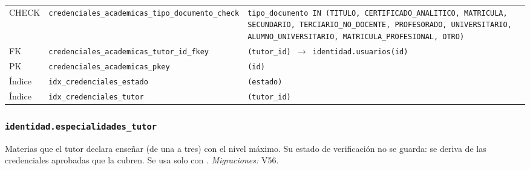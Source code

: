 {\begin{xltabular}{\textwidth}{@{}>{\raggedright\arraybackslash}p{1.7cm} >{\raggedright\arraybackslash}p{4.6cm} L@{}}
    CHECK & \texttt{credenciales\_\allowbreak{}academicas\_\allowbreak{}tipo\_\allowbreak{}documento\_\allowbreak{}check} & \texttt{tipo\_\allowbreak{}documento IN (\allowbreak{}\textquotesingle{}TITULO\textquotesingle{},\allowbreak{} \textquotesingle{}CERTIFICADO\_\allowbreak{}ANALITICO\textquotesingle{},\allowbreak{} \textquotesingle{}MATRICULA\textquotesingle{},\allowbreak{} \textquotesingle{}SECUNDARIO\textquotesingle{},\allowbreak{} \textquotesingle{}TERCIARIO\_\allowbreak{}NO\_\allowbreak{}DOCENTE\textquotesingle{},\allowbreak{} \textquotesingle{}PROFESORADO\textquotesingle{},\allowbreak{} \textquotesingle{}UNIVERSITARIO\textquotesingle{},\allowbreak{} \textquotesingle{}ALUMNO\_\allowbreak{}UNIVERSITARIO\textquotesingle{},\allowbreak{} \textquotesingle{}MATRICULA\_\allowbreak{}PROFESIONAL\textquotesingle{},\allowbreak{} \textquotesingle{}OTRO\textquotesingle{})} \\
    FK & \texttt{credenciales\_\allowbreak{}academicas\_\allowbreak{}tutor\_\allowbreak{}id\_\allowbreak{}fkey} & \texttt{(\allowbreak{}tutor\_\allowbreak{}id) $\rightarrow$ identidad.usuarios(\allowbreak{}id)} \\
    PK & \texttt{credenciales\_\allowbreak{}academicas\_\allowbreak{}pkey} & \texttt{(\allowbreak{}id)} \\
    Índice & \texttt{idx\_\allowbreak{}credenciales\_\allowbreak{}estado} & \texttt{(\allowbreak{}estado)} \\
    Índice & \texttt{idx\_\allowbreak{}credenciales\_\allowbreak{}tutor} & \texttt{(\allowbreak{}tutor\_\allowbreak{}id)} \\
\end{xltabular}
}

\subsubsection{\texorpdfstring{\texttt{identidad.especialidades\_\allowbreak{}tutor}}{identidad.especialidades\_tutor}}\label{dd:identidad.especialidades_tutor}

Materias que el tutor declara enseñar (de una a tres) con el nivel máximo. Su estado de verificación no se guarda: se deriva de las credenciales aprobadas que la cubren. Se usa solo con . \emph{Migraciones:} V56.


